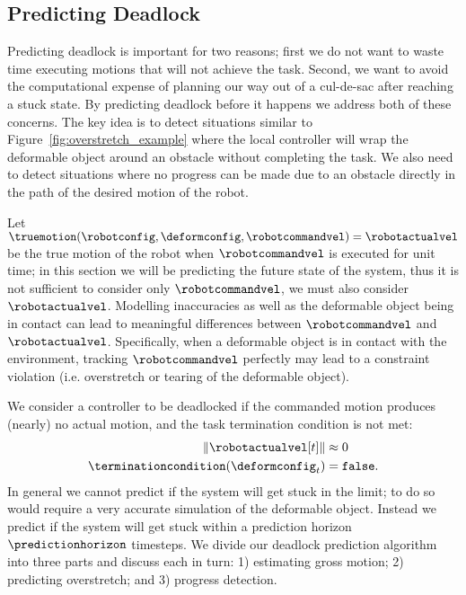 \subsection{Predicting Deadlock}
\label{sec:predicting_deadlock}



Predicting deadlock is important for two reasons; first we do not want to waste time executing motions that will not achieve the task. Second, we want to avoid the computational expense of planning our way out of a cul-de-sac after reaching a stuck state. By predicting deadlock before it happens we address both of these concerns. The key idea is to detect situations similar to Figure~\ref{fig:overstretch_example} where the local controller will wrap the deformable object around an obstacle without completing the task. We also need to detect situations where no progress can be made due to an obstacle directly in the path of the desired motion of the robot.



Let $\truemotion(\robotconfig, \deformconfig, \robotcommandvel) = \robotactualvel$ be the true motion of the robot when $\robotcommandvel$ is executed for unit time; in this section we will be predicting the future state of the system, thus it is not sufficient to consider only $\robotcommandvel$, we must also consider $\robotactualvel$.  Modelling inaccuracies as well as the deformable object being in contact can lead to meaningful differences between $\robotcommandvel$ and $\robotactualvel$. Specifically, when a deformable object is in contact with the environment, tracking $\robotcommandvel$ perfectly may lead to a constraint violation (i.e. overstretch or tearing of the deformable object).

We consider a controller to be deadlocked if the commanded motion produces (nearly) no actual motion, and the task termination condition is not met:
\begin{equation}
    \begin{split}
        \| \robotactualvel[t] \|               &\approx 0 \\
        \terminationcondition(\deformconfig_t) &= \texttt{false}.
        \label{eqn:stuck}
    \end{split}
\end{equation}
In general we cannot predict if the system will get stuck in the limit; to do so would require a very accurate simulation of the deformable object. Instead we predict if the system will get stuck within a prediction horizon $\predictionhorizon$ timesteps. We divide our deadlock prediction algorithm into three parts and discuss each in turn: 1) estimating gross motion; 2) predicting overstretch; and 3) progress detection.



